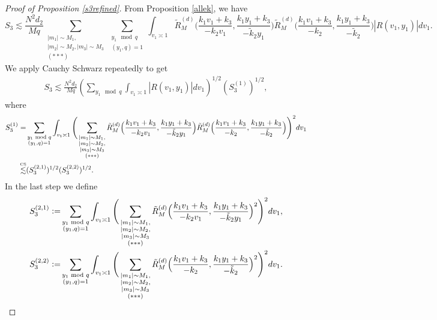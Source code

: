\begin{proof}[Proof of Proposition \ref{s3refined}]
    From Proposition \ref{allek}, we have
    \[
    S_3\lesssim \frac{N^2d_2}{Mq} \sum_{\substack{|m_1|\sim M_1,\\|m_2|\sim M_2,|m_3|\sim M_3\\
        (***)}}\sum_{\substack{y_1\mod q\\ (y_1,q)=1} }\int_{v_1\asymp 1}
        \tilde{R}_M^{(d)}\Big(\frac{k_1v_1+k_3}{-k_2v_1},\frac{k_1y_1+k_3}{-\tilde{k}_2y_1}\Big)\tilde{R}_M^{(d)}\Big(\frac{k_1v_1+k_3}{-k_2},\frac{k_1y_1+k_3}{-\tilde{k}_2}\Big)|R\left(v_1,y_1\right)| dv_1.
    \]
    We apply Cauchy Schwarz repeatedly to get \begin{align*}
        S_3\lesssim \frac{N^2d_2}{Mq} (\sum_{y_1\mod q}\int_{v_1\asymp 1}|R\left(v_1,y_1\right)| dv_1)^{1/2} (S_3^{(1)})^{1/2},
    \end{align*}
    where \begin{align*}
        S_3^{(1)}=&\sum_{\substack{y_1\mod q\\ (y_1,q)=1} }\int_{v_1\asymp 1}\Bigg(\sum_{\substack{|m_1|\sim M_1,\\|m_2|\sim M_2,\\|m_3|\sim M_3\\
        (***)}}
        \tilde{R}_M^{(d)}\Big(\frac{k_1v_1+k_3}{-k_2v_1},\frac{k_1y_1+k_3}{-\tilde{k}_2y_1}\Big)\tilde{R}_M^{(d)}\Big(\frac{k_1v_1+k_3}{-k_2},\frac{k_1y_1+k_3}{-\tilde{k}_2}\Big)\Bigg)^2 dv_1\\
        \stackon{CS}{\lesssim}& ( S_3^{(2,1)} )^{1/2}( S_3^{(2,2)} )^{1/2}.
    \end{align*}
    In the last step we define \begin{align*}
        S_3^{(2,1)}\defeq&\sum_{\substack{y_1\mod q\\ (y_1,q)=1} }\int_{v_1\asymp 1}\Bigg(\sum_{\substack{|m_1|\sim M_1,\\|m_2|\sim M_2,\\|m_3|\sim M_3\\
        (***)}}
        \tilde{R}_M^{(d)}\Big(\frac{k_1v_1+k_3}{-k_2v_1},\frac{k_1y_1+k_3}{-\tilde{k}_2y_1}\Big)^2\Bigg)^2 dv_1,
        \\
        S_3^{(2,2)}\defeq&\sum_{\substack{y_1\mod q\\ (y_1,q)=1} }\int_{v_1\asymp 1}\Bigg(\sum_{\substack{|m_1|\sim M_1,\\|m_2|\sim M_2,\\|m_3|\sim M_3\\
        (***)}}
       \tilde{R}_M^{(d)}\Big(\frac{k_1v_1+k_3}{-k_2},\frac{k_1y_1+k_3}{-\tilde{k}_2}\Big)^2\Bigg)^2 dv_1.

\end{align*}
\end{proof}
